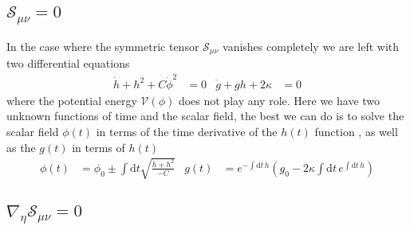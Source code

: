 \documentclass[10pt,a4paper]{article}
\begin{document}
\subsection{$\mathcal{S}_{\mu\nu} = 0 $}

In the case where the symmetric tensor $\mathcal{S}_{\mu\nu}$ vanishes completely we are left with two differential equations
\begin{align}
  \dot{h} + h^2 + C\dot{\phi}^2 & = 0 & \dot{g} + gh + 2\kappa & = 0
\end{align}
where the potential energy $\mathcal{V}(\phi)$ does not play any role. Here we have two unknown functions of time and the scalar field, the best we 
can do is to solve the scalar field $\phi(t)$ in terms of the time derivative of the $h(t)$ function , as well as the $g(t)$ in terms of $h(t)$
\begin{align}
  \phi(t) & = \phi_0 \pm \int \mathrm{d}t \sqrt{\frac{\dot{h} + h^2}{-C}} & 
  g(t) & = e^{- \int \mathrm{d}t \, h} \left( g_0 - 2 \kappa \int \mathrm{d}t \, e^{\int \mathrm{d}t \, h} \right)
\end{align}


\subsection{$\nabla_{\eta} \mathcal{S}_{\mu\nu} = 0 $}
\end{document}
